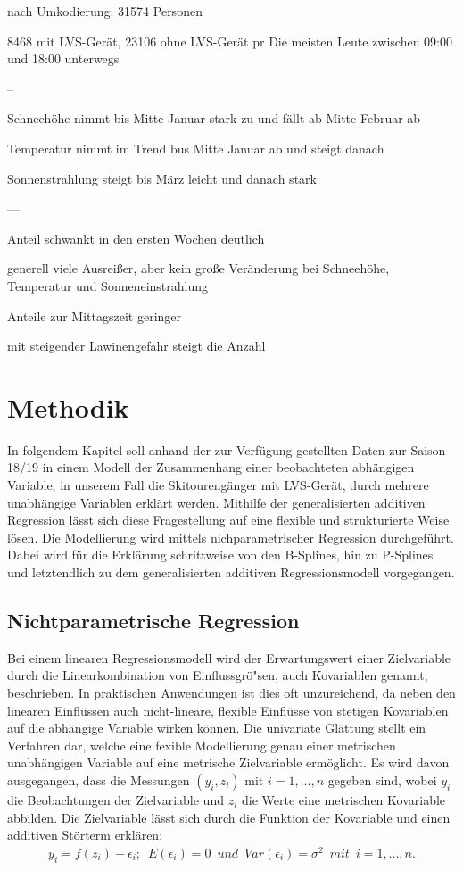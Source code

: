\documentclass[12pt]{scrreprt}
\begin{document}
	nach Umkodierung: 31574 Personen
	
	8468 mit LVS-Gerät, 23106 ohne LVS-Gerät
	pr
	Die meisten Leute zwischen 09:00 und 18:00 unterwegs
	
	--
	
	Schneehöhe nimmt bis Mitte Januar stark zu und fällt ab Mitte Februar ab
	
	Temperatur nimmt im Trend bus Mitte Januar ab und steigt danach
	
	Sonnenstrahlung steigt bis März leicht und danach stark
	
	
	---
	
	
	Anteil schwankt in den ersten Wochen deutlich
	
	generell viele Ausreißer, aber kein große Veränderung bei Schneehöhe, Temperatur und Sonneneinstrahlung
	
	Anteile zur Mittagszeit geringer
	
	mit steigender Lawinengefahr steigt die Anzahl
	
	\chapter{Methodik}
	In folgendem Kapitel soll anhand der zur Verfügung gestellten Daten zur Saison 18/19 in einem Modell der Zusammenhang einer beobachteten abhängigen Variable, in unserem Fall die Skitourengänger mit LVS-Gerät,  durch mehrere unabhängige Variablen erklärt werden.
	Mithilfe der generalisierten additiven Regression lässt sich diese Fragestellung auf eine flexible und strukturierte Weise lösen. Die Modellierung wird mittels nichparametrischer Regression durchgeführt.
	Dabei wird für die Erklärung schrittweise von den B-Splines, hin zu P-Splines und letztendlich zu dem generalisierten additiven Regressionsmodell vorgegangen.
	
	\section{Nichtparametrische Regression}
	Bei einem linearen Regressionsmodell wird der Erwartungswert einer  Zielvariable durch die Linearkombination von Einflussgrö"sen, auch  Kovariablen genannt, beschrieben. In praktischen Anwendungen ist dies oft unzureichend, da neben den linearen Einflüssen auch nicht-lineare, flexible Einflüsse von stetigen Kovariablen auf die abhängige Variable wirken können.
	Die univariate Glättung stellt ein Verfahren dar, welche eine fexible Modellierung genau einer metrischen unabhängigen Variable auf eine metrische Zielvariable ermöglicht. Es wird davon ausgegangen, dass die Messungen $(y_{i},z_{i})$ mit $i=1,...,n$ gegeben sind, wobei $y_{i}$ die Beobachtungen der Zielvariable und $z_{i}$ die Werte eine metrischen Kovariable abbilden. Die Zielvariable lässt sich durch die Funktion der Kovariable und einen additiven Störterm erklären:
	\begin{align}
	y_{i}=f(z_{i})+\epsilon_{i};\enspace E(\epsilon_{i})=0 \enspace und \enspace Var(\epsilon_{i})=\sigma^2 \enspace mit \enspace i=1,...,n.
	\end{align}
	
\end{document}
